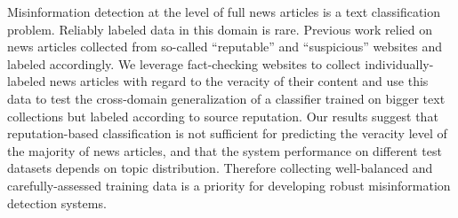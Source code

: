 Misinformation detection at the level of full news articles is a text classification problem. Reliably labeled data in this domain is rare. Previous work relied on news articles collected from so-called ``reputable'' and ``suspicious'' websites and labeled accordingly. We leverage fact-checking websites to collect individually-labeled news articles with regard to the veracity of their content and use this data to test the cross-domain generalization of a classifier trained on bigger text collections but labeled according to source reputation. Our results suggest that reputation-based classification is not sufficient for predicting the veracity level of the majority of news articles, and that the system performance on different test datasets depends on topic distribution. Therefore collecting well-balanced and carefully-assessed training data is a priority for developing robust misinformation detection systems.

